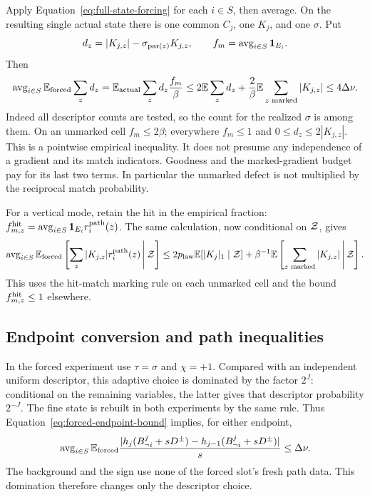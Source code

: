 Apply Equation~\ref{eq:full-state-forcing} for each $i\in S$, then
average. On the resulting single actual state there is one common
$C_j$, one $K_j$, and one $\sigma$. Put
\[
 d_z=|K_{j,z}|-\sigma_{\operatorname{par}(z)}K_{j,z},\qquad
 f_m=\operatorname{avg}_{i\in S}\mathbf 1_{E_i}.
\]
Then
\begin{equation}\label{eq:match-defect-transfer}
 \operatorname{avg}_{i\in S}\mathbb E_{\rm forced}\sum_zd_z
 =\mathbb E_{\rm actual}\sum_zd_z\frac{f_m}\beta
 \le2\mathbb E\sum_zd_z+\frac2\beta\mathbb E\sum_{z\text{ marked}}|K_{j,z}|
 \le4\Delta\nu.
\end{equation}
Indeed all descriptor counts are tested, so the count for the realized
$\sigma$ is among them. On an unmarked cell $f_m\le2\beta$;
everywhere $f_m\le1$ and $0\le d_z\le2|K_{j,z}|$. This is a pointwise
empirical inequality. It does not presume any independence of a
gradient and its match indicators. Goodness and the marked-gradient
budget pay for its last two terms. In particular the unmarked defect
is not multiplied by the reciprocal match probability.

For a vertical mode, retain the hit in the empirical fraction:
$f_{m,z}^{\rm hit}=\operatorname{avg}_{i\in S}\mathbf 1_{E_i}r_i^{\rm path}(z)$.
The same calculation, now conditional on $\mathcal Z$, gives
\begin{equation}\label{eq:match-hit-transfer}
 \operatorname{avg}_{i\in S}\mathbb E_{\rm forced}
             \left[\sum_z|K_{j,z}|r_i^{\rm path}(z)\,\middle|\,\mathcal Z\right]
 \le2p_{\rm law}\mathbb E[|K_j|_1\mid\mathcal Z]
       +\beta^{-1}\mathbb E\left[\sum_{z\text{ marked}}|K_{j,z}|\,
                                                 \middle|\,\mathcal Z\right].
\end{equation}
This uses the hit-match marking rule on each unmarked cell and the
bound $f_{m,z}^{\rm hit}\le1$ elsewhere.

\subsection{Endpoint conversion and path inequalities}

In the forced experiment use $\tau=\sigma$ and $\chi=+1$.
Compared with an independent uniform descriptor, this adaptive choice
is dominated by the factor $2^J$: conditional on the remaining variables,
the latter gives that descriptor probability $2^{-J}$. The fine state
is rebuilt in both experiments by the same rule. Thus
Equation~\ref{eq:forced-endpoint-bound} implies, for either endpoint,
\begin{equation}\label{eq:adaptive-endpoint-bound}
 \operatorname{avg}_{i\in S}\mathbb E_{\rm forced}
 \frac{|h_j(B^j_{\neg i}+sD^\pm)
                      -h_{j-1}(B^j_{\neg i}+sD^\pm)|}{s}
 \le\Delta\nu.
\end{equation}
The background and the sign use none of the forced slot's fresh path
data. This domination therefore changes only the descriptor choice.

